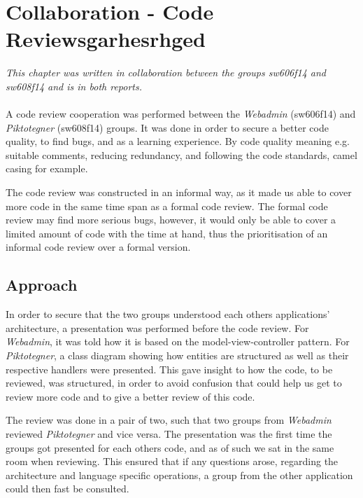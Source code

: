 \chapter{Collaboration - Code Reviewsgarhesrhged}\label{chap:codeReviewCommonActivity}
\textit{This chapter was written in collaboration between the groups sw606f14 and sw608f14 and is in both reports.}\\\\

A code review cooperation was performed between the \textit{Webadmin} (sw606f14) and \textit{Piktotegner} (sw608f14) groups.
It was done in order to secure a better code quality, to find bugs, and as a learning experience.
By code quality meaning e.g. suitable comments, reducing redundancy, and following the code standards, camel casing for example.

The code review was constructed in an informal way, as it made us able to cover more code in the same time span as a formal code review.
The formal code review may find more serious bugs, however, it would only be able to cover a limited amount of code with the time at hand, thus the prioritisation of an informal code review over a formal version.


\section*{Approach}
In order to secure that the two groups understood each others applications' architecture, a presentation was performed before the code review. 
For \textit{Webadmin}, it was told how it is based on the model-view-controller pattern.
For \textit{Piktotegner}, a class diagram showing how entities are structured as well as their respective handlers were presented.
This gave insight to how the code, to be reviewed, was structured, in order to avoid confusion that could help us get to review more code and to give a better review of this code.

The review was done in a pair of two, such that two groups from \textit{Webadmin} reviewed \textit{Piktotegner} and vice versa.
The presentation was the first time the groups got presented for each others code, and as of such we sat in the same room when reviewing.
This ensured that if any questions arose, regarding the architecture and language specific operations, a group from the other application could then fast be consulted.

